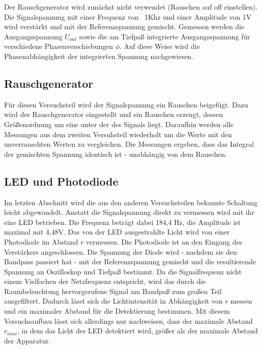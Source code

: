 Der Rauschgenerator wird zunächst nicht verwendet (Rauschen auf off einstellen).
Die Signalspannung mit einer Frequenz von ~1Khz und einer Amplitude von 1V
wird verstärkt und mit der
Referenzspannung gemischt. Gemessen werden die Ausgangsspannung $U_{out}$
sowie die am Tiefpaß
integrierte Ausgangsspannung für verschiedene Phasenverschiebungen $\phi$. Auf
diese
Weise wird die Phasenabhängigkeit der integrierten Spannung nachgewiesen.

\subsection{Rauschgenerator}
Für diesen Versuchsteil wird der Signalspannung ein Rauschen beigefügt. Dazu
wird der Rauschgenerator eingestellt und ein Rauschen erzeugt, dessen
Größenordnung um eine unter der des Signals liegt. Daraufhin werden alle
Messungen aus dem zweiten Versuhsteil wiederholt um die Werte mit den
unverrauschten Werten zu vergleichen. Die Messungen ergeben, dass das Integral
der gemischten Spannung identisch ist - unabhängig von dem Rauschen.

\subsection{LED und Photodiode}
Im letzten Abschnitt wird die aus den anderen Versuchsteilen bekannte Schaltung
leicht abgewandelt. Anstatt die Signalspannung direkt zu vermessen wird mit ihr
eine LED betrieben. Die Frequenz beträgt dabei 184,4 Hz, die Amplitude ist
maximal mit 4,48V. Das von der LED ausgestrahlte Licht wird von einer Photodiode
im Abstand $r$ vermessen. Die Photodiode ist an den Eingang des Verstärkers
angeschlossen. Die Spannung der Diode wird
- nachdem sie den Bandpass passiert hat - mit der
Referenzspannung gemischt und die resultierende Spannung an
Oszilloskop und Tiefpaß bestimmt. Da die Signalfrequenz nicht einem Vielfachen
der Netzfrequenz entspricht, wird das durch die Raumbeleuchtung hervorgerufene
Signal am Bandpaß
zum großen Teil ausgefiltert. Dadurch lässt sich die Lichtintensität in
Abhängigkeit von $r$ messen und ein maximaler Abstand für die Detektierung
bestimmen. Mit diesem Versuchsaufbau lässt sich allerdings nur nachweisen, dass
der maximale Abstand $r_{max}$, in dem das Licht der LED detektiert wird,
größer als der maximale Abstand der Apparatur.
